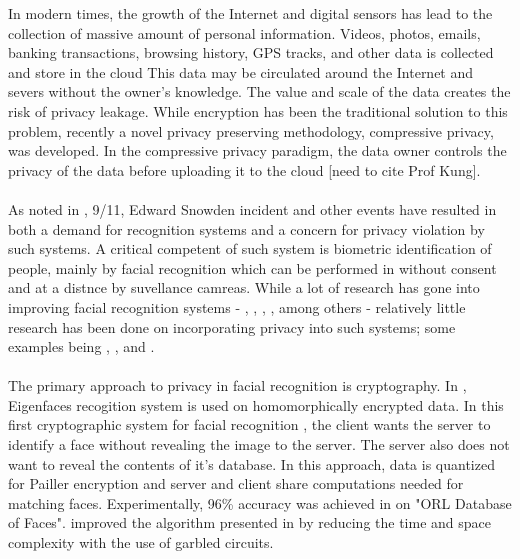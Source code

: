 \documentclass{article}
\begin{document}
In modern times, the growth of the Internet and digital sensors has lead to the collection of massive amount of personal information. 
Videos, photos, emails, banking transactions, browsing history, GPS tracks, and other data is collected and store in the cloud  
This data may be circulated around the Internet and severs without the owner's knowledge. The value and scale of the data creates 
the risk of privacy leakage. While encryption has been the traditional solution to this problem, recently a novel privacy preserving 
methodology, compressive privacy, was developed. In the compressive privacy paradigm, the data owner controls the privacy of the data 
before uploading it to the cloud [need to cite Prof Kung].    
\\\\
As noted in \cite{bowyer2004face}, 9/11, Edward Snowden incident and other events have resulted in both a demand for 
recognition systems and a concern for privacy violation by such systems. A critical competent of such system is biometric identification of people, 
mainly by facial recognition which can be performed in without consent and at a distnce by suvellance camreas. 
While a lot of research has gone into improving facial recognition systems - \cite{bouzalmat2014comparative}, 
\cite{spies2000face}, \cite{bouzalmat2011facial}, 
\cite{dehai2013pca}, \cite{samra2003face} among others - relatively little research has been done on incorporating privacy into such systems; 
some examples being \cite{erkin2009privacy}, \cite{sadeghi2010efficient}, and \cite{kevenaar2005face}.    
\\\\
The primary approach to privacy in facial recognition is cryptography. In \cite{erkin2009privacy}, 
Eigenfaces recogition system is used on homomorphically encrypted data. In this first cryptographic system 
for facial recognition \cite{erkin2009privacy}, the client wants the server to identify a face without revealing 
the image to the server. The server also does not want to reveal the contents of it's database. In this approach, 
data is quantized for Pailler encryption and server and client share computations needed for matching faces.
\cite{erkin2009privacy} Experimentally, 96\% accuracy was achieved in \cite{erkin2009privacy} on "ORL Database of Faces". 
\cite{sadeghi2010efficient} improved the algorithm presented in \cite{erkin2009privacy} by reducing the time and space 
complexity with the use of garbled circuits. 
\\\\
\end{document}
